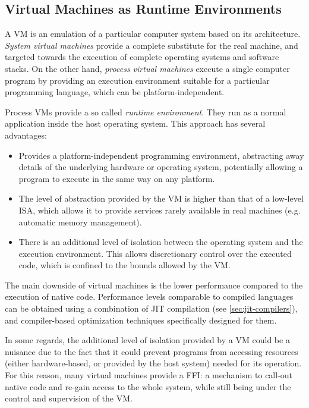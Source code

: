 \subsection{Virtual Machines as Runtime Environments}
  \label{sec:virtual-machines}

A \gls{VM} is an \gls{emulation} of a particular computer system based on its
architecture. \emph{System virtual machines} provide a complete substitute for
the real machine, and targeted towards the execution of complete operating
systems and software stacks. On the other hand, \emph{process virtual
machines} execute a single computer program by providing an execution
environment suitable for a particular programming language, which can be
platform-independent.

Process \gls{VM}s provide a so called \emph{runtime environment}. They run as
a normal application inside the host operating system. This approach has
several advantages:

\begin{itemize}
	\item Provides a platform-independent programming environment,
		abstracting away details of the underlying hardware or operating system,
		potentially allowing a program to execute in the same way on any platform.
	\item The level of abstraction provided by the \gls{VM} is higher than that
		of a low-level \gls{ISA}, which allows it to provide services rarely
		available in real machines (e.g. automatic memory management).
	\item There is an additional level of isolation between the operating system
		and the execution environment. This allows discretionary control over the
		executed code, which is confined to the bounds allowed by the \gls{VM}.
\end{itemize}

The main downside of virtual machines is the lower performance compared to the
execution of native code. Performance levels comparable to compiled languages
can be obtained using a combination of \gls{JIT} compilation (see
\autoref{sec:jit-compilers}), and compiler-based optimization techniques
specifically designed for them.

In some regards, the additional level of isolation provided by a \gls{VM}
could be a nuisance due to the fact that it could prevent programs from
accessing resources (either hardware-based, or provided by the host system)
needed for its operation. For this reason, many virtual machines provide
a \gls{FFI}: a mechanism to call-out native code and re-gain access to the
whole system, while still being under the control and supervision of the
\gls{VM}.


